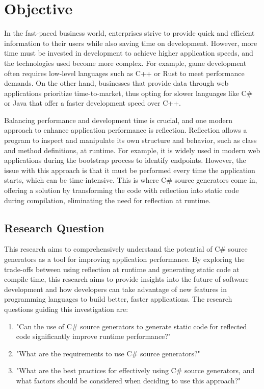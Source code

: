 \chapter{Objective}

In the fast-paced business world, enterprises strive to provide quick and efficient information to their users while also saving time on development. However, more time must be invested in development to achieve higher application speeds, and the technologies used become more complex. For example, game development often requires low-level languages such as C++ or Rust to meet performance demands. On the other hand, businesses that provide data through web applications prioritize time-to-market, thus opting for slower languages like C\# or Java that offer a faster development speed over C++.

Balancing performance and development time is crucial, and one modern approach to enhance application performance is reflection. Reflection allows a program to inspect and manipulate its own structure and behavior, such as class and method definitions, at runtime. For example, it is widely used in modern web applications during the bootstrap process to identify endpoints. However, the issue with this approach is that it must be performed every time the application starts, which can be time-intensive. This is where C\# source generators come in, offering a solution by transforming the code with reflection into static code during compilation, eliminating the need for reflection at runtime.

\section{Research Question}

This research aims to comprehensively understand the potential of C\# source generators as a tool for improving application performance. By exploring the trade-offs between using reflection at runtime and generating static code at compile time, this research aims to provide insights into the future of software development and how developers can take advantage of new features in programming languages to build better, faster applications. The research questions guiding this investigation are:

\begin{enumerate}[label=\textbf{RQ.\arabic*}:, leftmargin=*, labelindent=1em]
    \item "Can the use of C\# source generators to generate static code for reflected code significantly improve runtime performance?"
    \item "What are the requirements to use C\# source generators?"
    \item "What are the best practices for effectively using C\# source generators, and what factors should be considered when deciding to use this approach?"
\end{enumerate}

